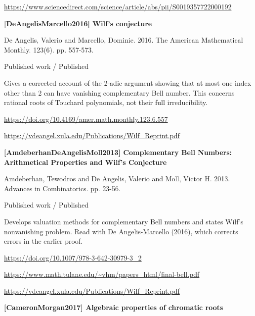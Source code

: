 \documentclass[11pt,a4paper,oneside,openany]{book}
\begin{document}
{\footnotesize\url{https://www.sciencedirect.com/science/article/abs/pii/S0019357722000192}}\par
\vspace{9pt}
\hypertarget{ref:DeAngelisMarcello2016}{}
{\sffamily\bfseries\color{atlasgreen}[DeAngelisMarcello2016] Wilf's conjecture}\par
\color{black} De Angelis, Valerio and Marcello, Dominic. 2016. The American Mathematical Monthly. 123(6). pp. 557-573.\par
{\small\sffamily\color{atlasgold}Published work / Published}\par
\color{black} Gives a corrected account of the 2-adic argument showing that at most one index other than 2 can have vanishing complementary Bell number. This concerns rational roots of Touchard polynomials, not their full irreducibility.\par
{\footnotesize\url{https://doi.org/10.4169/amer.math.monthly.123.6.557}}\par
{\footnotesize\url{https://vdeangel.xula.edu/Publications/Wilf_Reprint.pdf}}\par
\vspace{9pt}
\hypertarget{ref:AmdeberhanDeAngelisMoll2013}{}
{\sffamily\bfseries\color{atlasgreen}[AmdeberhanDeAngelisMoll2013] Complementary Bell Numbers: Arithmetical Properties and Wilf's Conjecture}\par
\color{black} Amdeberhan, Tewodros and De Angelis, Valerio and Moll, Victor H. 2013. Advances in Combinatorics. pp. 23-56.\par
{\small\sffamily\color{atlasgold}Published work / Published}\par
\color{black} Develops valuation methods for complementary Bell numbers and states Wilf's nonvanishing problem. Read with De Angelis-Marcello (2016), which corrects errors in the earlier proof.\par
{\footnotesize\url{https://doi.org/10.1007/978-3-642-30979-3_2}}\par
{\footnotesize\url{https://www.math.tulane.edu/~vhm/papers_html/final-bell.pdf}}\par
{\footnotesize\url{https://vdeangel.xula.edu/Publications/Wilf_Reprint.pdf}}\par
\vspace{9pt}
\hypertarget{ref:CameronMorgan2017}{}
{\sffamily\bfseries\color{atlasgreen}[CameronMorgan2017] Algebraic properties of chromatic roots}\par
\end{document}
